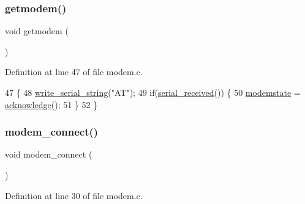 \subsubsection{\texorpdfstring{getmodem()}{getmodem()}}
{\footnotesize\ttfamily void getmodem (\begin{DoxyParamCaption}{ }\end{DoxyParamCaption})}



Definition at line 47 of file modem.\+c.


\begin{DoxyCode}
47                 \{
48     \hyperlink{a00050_aabbe45d6670f606c53ba38a5fb14b650_aabbe45d6670f606c53ba38a5fb14b650}{write\_serial\_string}(\textcolor{stringliteral}{"AT"});
49     \textcolor{keywordflow}{if}(\hyperlink{a00050_af10f0e64ba89e8635aa7245ca08297c5_af10f0e64ba89e8635aa7245ca08297c5}{serial\_received}()) \{
50         \hyperlink{a00038_a0105e5654e7f0fa503f2853c88a2f782_a0105e5654e7f0fa503f2853c88a2f782}{modemstate} = \hyperlink{a00038_a8529dba543149138317e327931bf5a5c_a8529dba543149138317e327931bf5a5c}{acknowledge}();
51     \}
52 \}
\end{DoxyCode}
\mbox{\label{a00041_a283a7e4b715971478687b2d7547780cb_a283a7e4b715971478687b2d7547780cb}} 
\subsubsection{\texorpdfstring{modem\+\_\+connect()}{modem\_connect()}}
{\footnotesize\ttfamily void modem\+\_\+connect (\begin{DoxyParamCaption}{ }\end{DoxyParamCaption})}



Definition at line 30 of file modem.\+c.


